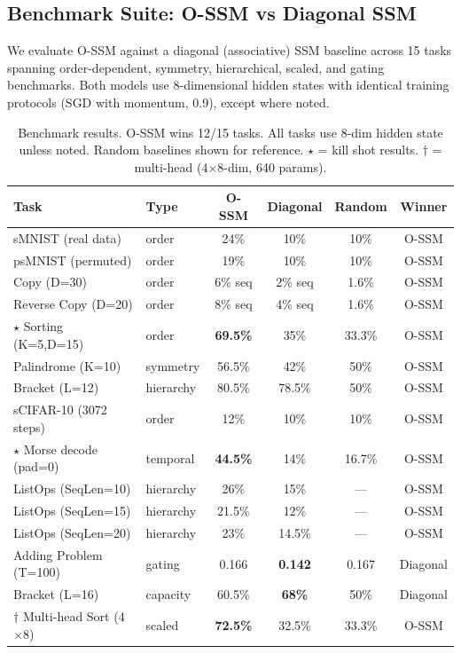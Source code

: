 \documentclass{article}
\begin{document}
\subsection{Benchmark Suite: O-SSM vs Diagonal SSM}

We evaluate O-SSM against a diagonal (associative) SSM baseline across 15 tasks spanning order-dependent, symmetry, hierarchical, scaled, and gating benchmarks.
Both models use 8-dimensional hidden states with identical training protocols (SGD with momentum, 0.9), except where noted.

\begin{table}[h]
\centering
\caption{Benchmark results. O-SSM wins 12/15 tasks. All tasks use 8-dim hidden state unless noted. Random baselines shown for reference. $\star$ = kill shot results. $\dagger$ = multi-head (4$\times$8-dim, 640 params).}
\label{tab:benchmarks}
\begin{tabular}{@{}llcccc@{}}
\toprule
\textbf{Task} & \textbf{Type} & \textbf{O-SSM} & \textbf{Diagonal} & \textbf{Random} & \textbf{Winner} \\
\midrule
sMNIST (real data) & order & 24\% & 10\% & 10\% & O-SSM \\
psMNIST (permuted) & order & 19\% & 10\% & 10\% & O-SSM \\
Copy (D=30) & order & 6\% seq & 2\% seq & 1.6\% & O-SSM \\
Reverse Copy (D=20) & order & 8\% seq & 4\% seq & 1.6\% & O-SSM \\
$\star$ Sorting (K=5,D=15) & order & \textbf{69.5\%} & 35\% & 33.3\% & O-SSM \\
Palindrome (K=10) & symmetry & 56.5\% & 42\% & 50\% & O-SSM \\
Bracket (L=12) & hierarchy & 80.5\% & 78.5\% & 50\% & O-SSM \\
sCIFAR-10 (3072 steps) & order & 12\% & 10\% & 10\% & O-SSM \\
$\star$ Morse decode (pad=0) & temporal & \textbf{44.5\%} & 14\% & 16.7\% & O-SSM \\
ListOps (SeqLen=10) & hierarchy & 26\% & 15\% & --- & O-SSM \\
ListOps (SeqLen=15) & hierarchy & 21.5\% & 12\% & --- & O-SSM \\
ListOps (SeqLen=20) & hierarchy & 23\% & 14.5\% & --- & O-SSM \\
\midrule
Adding Problem (T=100) & gating & 0.166 & \textbf{0.142} & 0.167 & Diagonal \\
Bracket (L=16) & capacity & 60.5\% & \textbf{68\%} & 50\% & Diagonal \\
$\dagger$ Multi-head Sort (4$\times$8) & scaled & \textbf{72.5\%} & 32.5\% & 33.3\% & O-SSM \\
\bottomrule
\end{tabular}
\end{table}
\end{document}
